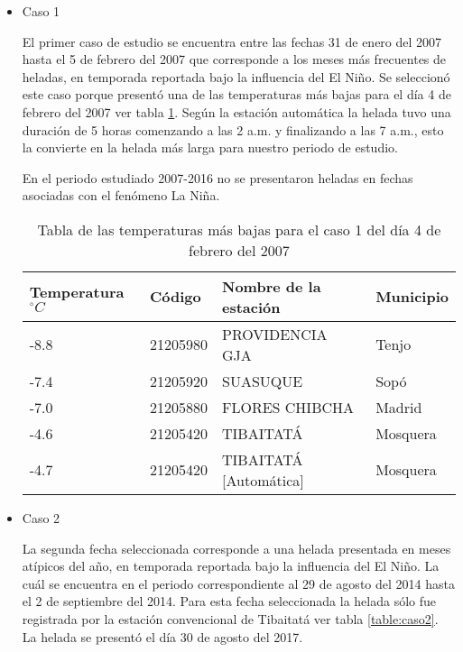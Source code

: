 \documentclass[11pt]{article}
\def\celc{$^{\circ}C$ }%
\begin{document}
\begin{itemize}
\item{Caso 1}%

El primer caso de estudio se encuentra entre las fechas 31 de enero del 2007 hasta el 5 de febrero del 2007 que corresponde a los meses más frecuentes de heladas, en temporada reportada bajo la influencia del El Niño. Se seleccionó este caso porque presentó una de las temperaturas más bajas para el día 4 de febrero del 2007 ver tabla \ref{table:caso1}. Según la estación automática la helada tuvo una duración de 5 horas comenzando a las 2 a.m. y finalizando a las 7 a.m., esto la convierte en la helada más larga para nuestro periodo de estudio.

En el periodo estudiado 2007-2016 no se presentaron heladas en fechas asociadas con el fenómeno La Niña.

\begin{table}[H]
\centering

\begin{tabular}{llll}
Temperatura \celc & Código   & Nombre de la estación & Municipio \\ \hline
-8.8           & 21205980 & PROVIDENCIA GJA       & Tenjo     \\
-7.4           & 21205920 & SUASUQUE              & Sopó      \\
-7.0           & 21205880 & FLORES CHIBCHA        & Madrid    \\
-4.6           & 21205420 & TIBAITATÁ             & Mosquera  \\
-4.7           & 21205420 & TIBAITATÁ [Automática]& Mosquera
\end{tabular}
\caption{Tabla de las temperaturas más bajas para el caso 1 del día 4 de febrero del 2007}
\label{table:caso1}
\end{table}

\item{Caso 2}%

La segunda fecha seleccionada corresponde a una helada presentada en meses atípicos del año, en temporada reportada bajo la influencia del El Niño. La cuál se encuentra en el periodo correspondiente al 29 de agosto del 2014 hasta el 2 de septiembre del 2014. Para esta fecha seleccionada la helada sólo fue registrada por la estación convencional de Tibaitatá ver tabla \ref{table:caso2}. La helada se presentó el día 30 de agosto del 2017.


\end{itemize}
\end{document}

